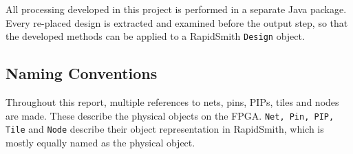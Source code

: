 All processing developed in this project is performed in a separate Java package. Every re-placed design is extracted and examined before the output step, so that the developed methods can be applied to a RapidSmith \texttt{Design} object.

\subsection{Naming Conventions}
\label{subsec:namingconventions}

Throughout this report, multiple references to nets, pins, PIPs, tiles and nodes are made. These describe the physical objects on the FPGA. \texttt{Net, Pin, PIP, Tile} and \texttt{Node} describe their object representation in RapidSmith, which is mostly equally named as the physical object. 